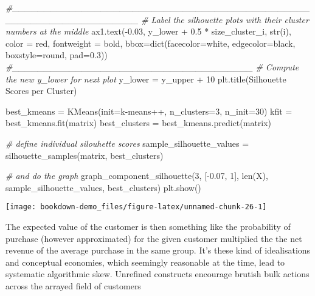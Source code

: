 \documentclass[]{tufte-book}
\newenvironment{Shaded}{}{}
\newcommand{\BuiltInTok}[1]{#1}
\newcommand{\CommentTok}[1]{\textcolor[rgb]{0.38,0.63,0.69}{\textit{#1}}}
\newcommand{\DecValTok}[1]{\textcolor[rgb]{0.25,0.63,0.44}{#1}}
\newcommand{\FloatTok}[1]{\textcolor[rgb]{0.25,0.63,0.44}{#1}}
\newcommand{\NormalTok}[1]{#1}
\newcommand{\OperatorTok}[1]{\textcolor[rgb]{0.40,0.40,0.40}{#1}}
\newcommand{\StringTok}[1]{\textcolor[rgb]{0.25,0.44,0.63}{#1}}
\theoremstyle{definition}
\theoremstyle{definition}
\theoremstyle{definition}
\theoremstyle{remark}
\begin{document}
\begin{Shaded}
\begin{Highlighting}[]
        \CommentTok{\#\_\_\_\_\_\_\_\_\_\_\_\_\_\_\_\_\_\_\_\_\_\_\_\_\_\_\_\_\_\_\_\_\_\_\_\_\_\_\_\_\_\_\_\_\_\_\_\_\_\_\_\_\_\_\_\_\_\_\_\_\_\_\_\_\_\_\_\_}
        \CommentTok{\# Label the silhouette plots with their cluster numbers at the middle}
\NormalTok{        ax1.text(}\OperatorTok{{-}}\FloatTok{0.03}\NormalTok{, y\_lower }\OperatorTok{+} \FloatTok{0.5} \OperatorTok{*}\NormalTok{ size\_cluster\_i, }\BuiltInTok{str}\NormalTok{(i), color }\OperatorTok{=} \StringTok{\textquotesingle{}red\textquotesingle{}}\NormalTok{, fontweight }\OperatorTok{=} \StringTok{\textquotesingle{}bold\textquotesingle{}}\NormalTok{,}
\NormalTok{                bbox}\OperatorTok{=}\BuiltInTok{dict}\NormalTok{(facecolor}\OperatorTok{=}\StringTok{\textquotesingle{}white\textquotesingle{}}\NormalTok{, edgecolor}\OperatorTok{=}\StringTok{\textquotesingle{}black\textquotesingle{}}\NormalTok{, boxstyle}\OperatorTok{=}\StringTok{\textquotesingle{}round, pad=0.3\textquotesingle{}}\NormalTok{))}
        \CommentTok{\#\_\_\_\_\_\_\_\_\_\_\_\_\_\_\_\_\_\_\_\_\_\_\_\_\_\_\_\_\_\_\_\_\_\_\_\_\_\_}
        \CommentTok{\# Compute the new y\_lower for next plot}
\NormalTok{        y\_lower }\OperatorTok{=}\NormalTok{ y\_upper }\OperatorTok{+} \DecValTok{10}
\NormalTok{    plt.title(}\StringTok{\textquotesingle{}Silhouette Scores per Cluster\textquotesingle{}}\NormalTok{)}

\NormalTok{best\_kmeans }\OperatorTok{=}\NormalTok{ KMeans(init}\OperatorTok{=}\StringTok{\textquotesingle{}k{-}means++\textquotesingle{}}\NormalTok{, n\_clusters}\OperatorTok{=}\DecValTok{3}\NormalTok{, n\_init}\OperatorTok{=}\DecValTok{30}\NormalTok{)}
\NormalTok{kfit }\OperatorTok{=}\NormalTok{ best\_kmeans.fit(matrix)}
\NormalTok{best\_clusters }\OperatorTok{=}\NormalTok{ best\_kmeans.predict(matrix)}

\CommentTok{\# define individual silouhette scores}
\NormalTok{sample\_silhouette\_values }\OperatorTok{=}\NormalTok{ silhouette\_samples(matrix, best\_clusters)}

\CommentTok{\# and do the graph}
\NormalTok{graph\_component\_silhouette(}\DecValTok{3}\NormalTok{, [}\OperatorTok{{-}}\FloatTok{0.07}\NormalTok{, }\DecValTok{1}\NormalTok{], }\BuiltInTok{len}\NormalTok{(X), sample\_silhouette\_values, best\_clusters)}
\NormalTok{plt.show()}
\end{Highlighting}
\end{Shaded}

\texttt{[image: bookdown-demo\_files/figure-latex/unnamed-chunk-26-1]}

The expected value of the customer is then something like the probability of purchase (however approximated) for the given customer multiplied the the net revenue of the average purchase in the same group. It's these kind of idealisations and conceptual economies, which seemingly reasonable at the time, lead to systematic algorithmic skew. Unrefined constructs encourage brutish bulk actions across the arrayed field of customers
\end{document}

